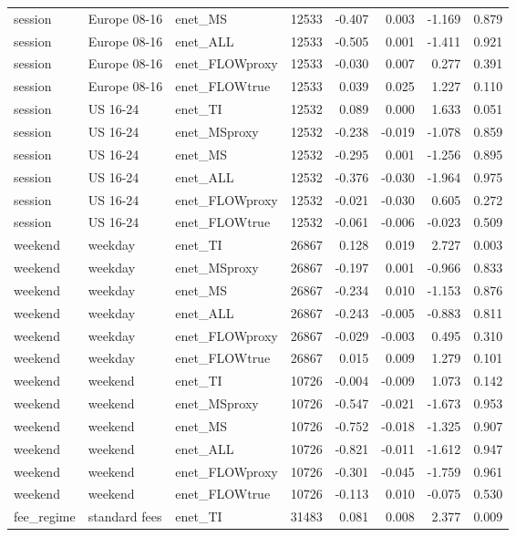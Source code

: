 \begin{tabular}{lllrrrrr}
session & Europe 08-16 & enet_MS & 12533 & -0.407 & 0.003 & -1.169 & 0.879 \\
session & Europe 08-16 & enet_ALL & 12533 & -0.505 & 0.001 & -1.411 & 0.921 \\
session & Europe 08-16 & enet_FLOWproxy & 12533 & -0.030 & 0.007 & 0.277 & 0.391 \\
session & Europe 08-16 & enet_FLOWtrue & 12533 & 0.039 & 0.025 & 1.227 & 0.110 \\
session & US 16-24 & enet_TI & 12532 & 0.089 & 0.000 & 1.633 & 0.051 \\
session & US 16-24 & enet_MSproxy & 12532 & -0.238 & -0.019 & -1.078 & 0.859 \\
session & US 16-24 & enet_MS & 12532 & -0.295 & 0.001 & -1.256 & 0.895 \\
session & US 16-24 & enet_ALL & 12532 & -0.376 & -0.030 & -1.964 & 0.975 \\
session & US 16-24 & enet_FLOWproxy & 12532 & -0.021 & -0.030 & 0.605 & 0.272 \\
session & US 16-24 & enet_FLOWtrue & 12532 & -0.061 & -0.006 & -0.023 & 0.509 \\
weekend & weekday & enet_TI & 26867 & 0.128 & 0.019 & 2.727 & 0.003 \\
weekend & weekday & enet_MSproxy & 26867 & -0.197 & 0.001 & -0.966 & 0.833 \\
weekend & weekday & enet_MS & 26867 & -0.234 & 0.010 & -1.153 & 0.876 \\
weekend & weekday & enet_ALL & 26867 & -0.243 & -0.005 & -0.883 & 0.811 \\
weekend & weekday & enet_FLOWproxy & 26867 & -0.029 & -0.003 & 0.495 & 0.310 \\
weekend & weekday & enet_FLOWtrue & 26867 & 0.015 & 0.009 & 1.279 & 0.101 \\
weekend & weekend & enet_TI & 10726 & -0.004 & -0.009 & 1.073 & 0.142 \\
weekend & weekend & enet_MSproxy & 10726 & -0.547 & -0.021 & -1.673 & 0.953 \\
weekend & weekend & enet_MS & 10726 & -0.752 & -0.018 & -1.325 & 0.907 \\
weekend & weekend & enet_ALL & 10726 & -0.821 & -0.011 & -1.612 & 0.947 \\
weekend & weekend & enet_FLOWproxy & 10726 & -0.301 & -0.045 & -1.759 & 0.961 \\
weekend & weekend & enet_FLOWtrue & 10726 & -0.113 & 0.010 & -0.075 & 0.530 \\
fee_regime & standard fees & enet_TI & 31483 & 0.081 & 0.008 & 2.377 & 0.009 \\

\end{tabular}

